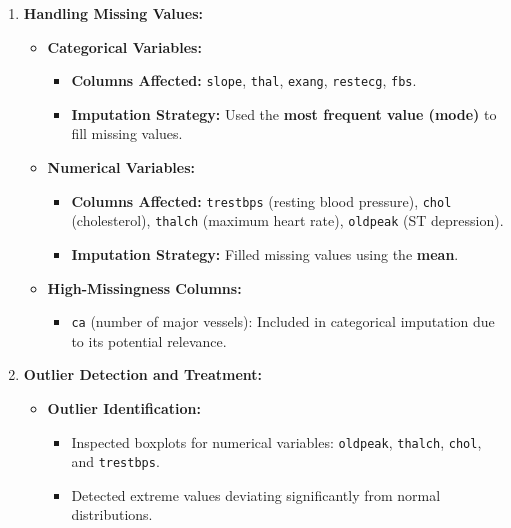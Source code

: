 \documentclass[pdflatex,sn-nature,Numbered]{sn-jnl}%
\theoremstyle{thmstyleone}%
\theoremstyle{thmstyletwo}%
\theoremstyle{thmstylethree}%
\begin{document}
\begin{enumerate}
    \item \textbf{Handling Missing Values:}
    \begin{itemize}
        \item \textbf{Categorical Variables:}
        \begin{itemize}
            \item \textbf{Columns Affected:} \texttt{slope}, \texttt{thal}, \texttt{exang}, \texttt{restecg}, \texttt{fbs}.
            \item \textbf{Imputation Strategy:} Used the \textbf{most frequent value (mode)} to fill missing values.
        \end{itemize}
        \item \textbf{Numerical Variables:}
        \begin{itemize}
            \item \textbf{Columns Affected:} \texttt{trestbps} (resting blood pressure), \texttt{chol} (cholesterol), \texttt{thalch} (maximum heart rate), \texttt{oldpeak} (ST depression).
            \item \textbf{Imputation Strategy:} Filled missing values using the \textbf{mean}.
        \end{itemize}
        \item \textbf{High-Missingness Columns:}
        \begin{itemize}
            \item \texttt{ca} (number of major vessels): Included in categorical imputation due to its potential relevance.
        \end{itemize}
    \end{itemize}

    \item \textbf{Outlier Detection and Treatment:}
    \begin{itemize}
        \item \textbf{Outlier Identification:}
        \begin{itemize}
            \item Inspected boxplots for numerical variables: \texttt{oldpeak}, \texttt{thalch}, \texttt{chol}, and \texttt{trestbps}.
            \item Detected extreme values deviating significantly from normal distributions.
        \end{itemize}
    \end{itemize}


\end{enumerate}
\end{document}
